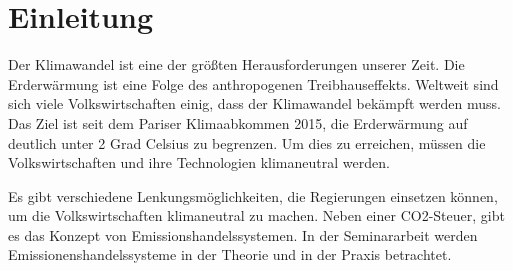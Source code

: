 \chapter{Einleitung}

Der Klimawandel ist eine der größten Herausforderungen unserer Zeit. 
Die Erderwärmung ist eine Folge des anthropogenen Treibhauseffekts.
Weltweit sind sich viele Volkswirtschaften einig, dass der Klimawandel bekämpft werden muss. 
Das Ziel ist seit dem Pariser Klimaabkommen 2015, die Erderwärmung auf deutlich unter 2 Grad Celsius zu begrenzen.
Um dies zu erreichen, müssen die Volkswirtschaften und ihre Technologien klimaneutral werden.

Es gibt verschiedene Lenkungsmöglichkeiten, die Regierungen einsetzen können, um die Volkswirtschaften klimaneutral zu machen.
Neben einer CO2-Steuer, gibt es das Konzept von Emissionshandelssystemen. 
In der Seminararbeit werden Emissionenshandelssysteme in der Theorie und in der Praxis betrachtet.
